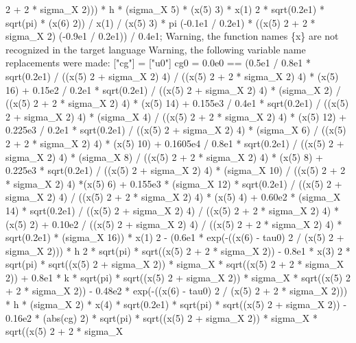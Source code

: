 \begin{maplegroup}
 2 + 2 * sigma\_X  2))) * h * (sigma\_X  5) * (x(5)  3) * x(1)  2 * sqrt(0.2e1) * sqrt(pi) * (x(6)  2)) / x(1) / (x(5)  3) * pi  (-0.1e1 / 0.2e1) * ((x(5)  2 + 2 * sigma\_X  2)  (-0.9e1 / 0.2e1)) / 0.4e1;
\underline{}Warning, the function names \{x\} are not recognized in the target language\underline{}\mapleresult
\underline{}Warning, the following variable name replacements were made: ["cg"] = ["u0"]\underline{}\mapleresult
cg0 = 0.0e0 == (0.5e1 / 0.8e1 * sqrt(0.2e1) / ((x(5)  2 + sigma\_X  2)  4) / ((x(5)  2 + 2 * sigma\_X  2)  4) * (x(5)  16) + 0.15e2 / 0.2e1 * sqrt(0.2e1) / ((x(5)  2 + sigma\_X  2)  4) * (sigma\_X  2) / ((x(5)  2 + 2 * sigma\_X  2)  4) * (x(5)  14) + 0.155e3 / 0.4e1 * sqrt(0.2e1) / ((x(5)  2 + sigma\_X  2)  4) * (sigma\_X  4) / ((x(5)  2 + 2 * sigma\_X  2)  4) * (x(5)  12) + 0.225e3 / 0.2e1 * sqrt(0.2e1) / ((x(5)  2 + sigma\_X  2)  4) * (sigma\_X  6) / ((x(5)  2 + 2 * sigma\_X  2)  4) * (x(5)  10) + 0.1605e4 / 0.8e1 * sqrt(0.2e1) / ((x(5)  2 + sigma\_X  2)  4) * (sigma\_X  8) / ((x(5)  2 + 2 * sigma\_X  2)  4) * (x(5)  8) + 0.225e3 * sqrt(0.2e1) / ((x(5)  2 + sigma\_X  2)  4) * (sigma\_X  10) / ((x(5)  2 + 2 * sigma\_X  2)  4) *(x(5)  6) + 0.155e3 * (sigma\_X  12) * sqrt(0.2e1) / ((x(5)  2 + sigma\_X  2)  4) / ((x(5)  2 + 2 * sigma\_X  2)  4) * (x(5)  4) + 0.60e2 * (sigma\_X  14) * sqrt(0.2e1) / ((x(5)  2 + sigma\_X  2)  4) / ((x(5)  2 + 2 * sigma\_X  2)  4) * (x(5)  2) + 0.10e2 / ((x(5)  2 + sigma\_X  2)  4) / ((x(5)  2 + 2 * sigma\_X  2)  4) * sqrt(0.2e1) * (sigma\_X  16)) * x(1)  2 - (0.6e1 * exp(-((x(6) - tau0)  2 / (x(5)  2 + sigma\_X  2))) * h  2 * sqrt(pi) * sqrt((x(5)  2 + 2 * sigma\_X  2)) - 0.8e1 * x(3)  2 * sqrt(pi) * sqrt((x(5)  2 + sigma\_X  2)) * sigma\_X * sqrt((x(5)  2 + 2 * sigma\_X  2)) + 0.8e1 * k * sqrt(pi) * sqrt((x(5)  2 + sigma\_X  2)) * sigma\_X * sqrt((x(5)  2 + 2 * sigma\_X  2)) - 0.48e2 * exp(-((x(6) - tau0)  2 / (x(5)  2 + 2 * sigma\_X  2))) * h * (sigma\_X  2) * x(4) * sqrt(0.2e1) * sqrt(pi) * sqrt((x(5)  2 + sigma\_X  2)) - 0.16e2 * (abs(cg)  2) * sqrt(pi) * sqrt((x(5)  2 + sigma\_X  2)) * sigma\_X * sqrt((x(5)  2 + 2 * sigma\_X 
\end{maplegroup}
